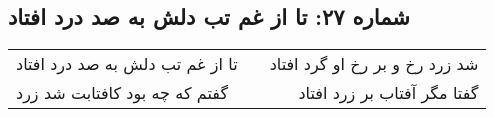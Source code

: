\begin{center}
\section*{شماره ۲۷: تا از غم تب دلش به صد درد افتاد}
\label{sec:027}
\begin{longtable}{l p{0.5cm} r}
تا از غم تب دلش به صد درد افتاد
&&
شد زرد رخ و بر رخ او گرد افتاد
\\
گفتم که چه بود کافتابت شد زرد
&&
گفتا مگر آفتاب بر زرد افتاد
\\
\end{longtable}
\end{center}
